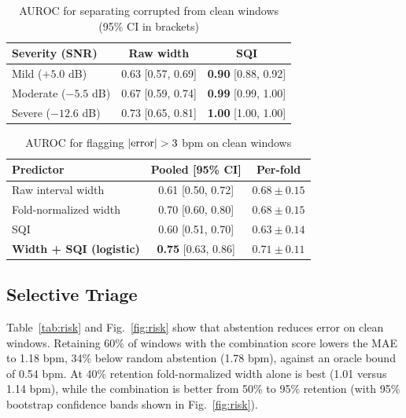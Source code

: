 \documentclass[conference]{IEEEtran}
\begin{document}
\begin{table}[!t]
\caption{AUROC for separating corrupted from clean windows (95\% CI in brackets)}
\label{tab:corrupt}
\centering\footnotesize
\renewcommand{\arraystretch}{1.1}
\begin{tabular}{@{}lcc@{}}
\toprule
\textbf{Severity (SNR)} & \textbf{Raw width} & \textbf{SQI} \\
\midrule
Mild ($+5.0$ dB) & 0.63 [0.57, 0.69] & \textbf{0.90} [0.88, 0.92] \\
Moderate ($-5.5$ dB) & 0.67 [0.59, 0.74] & \textbf{0.99} [0.99, 1.00] \\
Severe ($-12.6$ dB) & 0.73 [0.65, 0.81] & \textbf{1.00} [1.00, 1.00] \\
\bottomrule
\end{tabular}
\end{table}

\begin{table}[!t]
\caption{AUROC for flagging $|{\rm error}|>3$ bpm on clean windows}
\label{tab:clean}
\centering\footnotesize
\renewcommand{\arraystretch}{1.1}
\begin{tabular}{@{}lcc@{}}
\toprule
\textbf{Predictor} & \textbf{Pooled [95\% CI]} & \textbf{Per-fold} \\
\midrule
Raw interval width & 0.61 [0.50, 0.72] & $0.68\pm0.15$ \\
Fold-normalized width & 0.70 [0.60, 0.80] & $0.68\pm0.15$ \\
SQI & 0.60 [0.51, 0.70] & $0.63\pm0.14$ \\
\textbf{Width + SQI (logistic)} & \textbf{0.75} [0.63, 0.86] & $0.71\pm0.11$ \\
\bottomrule
\end{tabular}
\end{table}

\subsection{Selective Triage}
Table~\ref{tab:risk} and Fig.~\ref{fig:risk} show that abstention reduces error on clean windows. Retaining 60\% of windows with the combination score lowers the MAE to 1.18 bpm, 34\% below random abstention (1.78 bpm), against an oracle bound of 0.54 bpm. At 40\% retention fold-normalized width alone is best (1.01 versus 1.14 bpm), while the combination is better from 50\% to 95\% retention (with 95\% bootstrap confidence bands shown in Fig.~\ref{fig:risk}).
\end{document}
